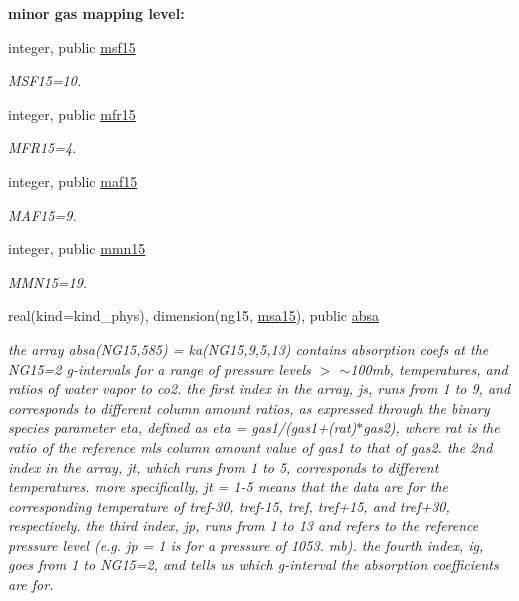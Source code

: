 \begin{Indent}\textbf{ minor gas mapping level\+:}\par
\begin{DoxyCompactItemize}
\item 
integer, public \hyperlink{group__module__radlw__kgbnn_gae1b588ee60974c2d451c89f842601e07}{msf15}
\begin{DoxyCompactList}\small\item\em M\+S\+F15=10. \end{DoxyCompactList}\item 
integer, public \hyperlink{group__module__radlw__kgbnn_gad4d78009d0c7ffa27dbb228e68307675}{mfr15}
\begin{DoxyCompactList}\small\item\em M\+F\+R15=4. \end{DoxyCompactList}\item 
integer, public \hyperlink{group__module__radlw__kgbnn_ga482858cf08fb1a14117dfbaa6a57fe8c}{maf15}
\begin{DoxyCompactList}\small\item\em M\+A\+F15=9. \end{DoxyCompactList}\item 
integer, public \hyperlink{group__module__radlw__kgbnn_ga8ab45999cfc7b9db0f3d3b61ccf803e8}{mmn15}
\begin{DoxyCompactList}\small\item\em M\+M\+N15=19. \end{DoxyCompactList}\item 
real(kind=kind\+\_\+phys), dimension(ng15, \hyperlink{namespacemodule__radlw__kgb15_abb9e98034166a07a6e349631d7fbb2a3}{msa15}), public \hyperlink{group__module__radlw__kgbnn_gaa6412ac501e2afed3d1b64b0cdcdab9e}{absa}
\begin{DoxyCompactList}\small\item\em the array absa(\+N\+G15,585) = ka(\+N\+G15,9,5,13) contains absorption coefs at the N\+G15=2 g-\/intervals for a range of pressure levels $>$ $\sim$100mb, temperatures, and ratios of water vapor to co2. the first index in the array, js, runs from 1 to 9, and corresponds to different column amount ratios, as expressed through the binary species parameter eta, defined as eta = gas1/(gas1+(rat)$\ast$gas2), where rat is the ratio of the reference mls column amount value of gas1 to that of gas2. the 2nd index in the array, jt, which runs from 1 to 5, corresponds to different temperatures. more specifically, jt = 1-\/5 means that the data are for the corresponding temperature of tref-\/30, tref-\/15, tref, tref+15, and tref+30, respectively. the third index, jp, runs from 1 to 13 and refers to the reference pressure level (e.\+g. jp = 1 is for a pressure of 1053. mb). the fourth index, ig, goes from 1 to N\+G15=2, and tells us which g-\/interval the absorption coefficients are for. \end{DoxyCompactList}\item 

\end{DoxyCompactItemize}
\end{Indent}
